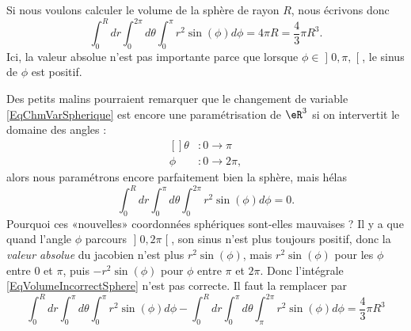 Si nous voulons calculer le volume de la sphère de rayon $R$, nous écrivons donc
\begin{equation}
	\int_0^Rdr\int_{0}^{2\pi}d\theta\int_0^{\pi}r^2 \sin(\phi)d\phi=4\pi R=\frac{ 4 }{ 3 }\pi R^3.
\end{equation}
Ici, la valeur absolue n'est pas importante parce que lorsque $\phi\in\mathopen] 0,\pi ,  \mathclose[$, le sinus de $\phi$ est positif.

Des petits malins pourraient remarquer que le changement de variable \eqref{EqChmVarSpherique} est encore une paramétrisation de $\eR^3$ si on intervertit le domaine des angles : 
\begin{equation}
	\begin{aligned}[]
		\theta&\colon 0 \to \pi\\
		\phi	&\colon 0\to 2\pi,
	\end{aligned}
\end{equation}
alors nous paramétrons encore parfaitement bien la sphère, mais hélas
\begin{equation}		\label{EqVolumeIncorrectSphere}
	\int_0^Rdr\int_{0}^{\pi}d\theta\int_0^{2\pi}r^2 \sin(\phi)d\phi=0.
\end{equation}
Pourquoi ces «nouvelles» coordonnées sphériques sont-elles mauvaises ? Il y a que quand l'angle $\phi$ parcours $\mathopen] 0 , 2\pi \mathclose[$, son sinus n'est plus toujours positif, donc la \emph{valeur absolue} du jacobien n'est plus $r^2\sin(\phi)$, mais $r^2\sin(\phi)$ pour les $\phi$ entre $0$ et $\pi$, puis $-r^2\sin(\phi)$ pour $\phi$ entre $\pi$ et $2\pi$. Donc l'intégrale \eqref{EqVolumeIncorrectSphere} n'est pas correcte. Il faut la remplacer par
\begin{equation}
	\int_0^Rdr\int_{0}^{\pi}d\theta\int_0^{\pi}r^2 \sin(\phi)d\phi- \int_0^Rdr\int_{0}^{\pi}d\theta\int_{\pi}^{2\pi}r^2 \sin(\phi)d\phi = \frac{ 4 }{ 3 }\pi R^3
\end{equation}
